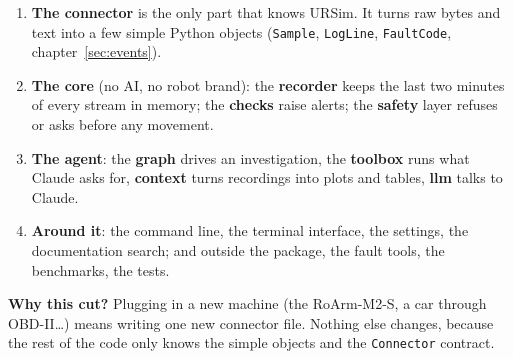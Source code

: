 \documentclass[10pt]{article}
\newcommand{\brkus}{\textunderscore\allowbreak}
\newcommand{\f}[1]{\texttt{\let\_\brkus #1}}
\begin{document}
\begin{enumerate}
\item \textbf{The connector} is the only part that knows URSim. It turns raw bytes and text into
a few simple Python objects (\f{Sample}, \f{LogLine}, \f{FaultCode}, chapter~\ref{sec:events}).
\item \textbf{The core} (no AI, no robot brand): the \textbf{recorder} keeps the last two minutes of
every stream in memory; the \textbf{checks} raise alerts; the \textbf{safety} layer refuses or
asks before any movement.
\item \textbf{The agent}: the \textbf{graph} drives an investigation, the \textbf{toolbox} runs
what Claude asks for, \textbf{context} turns recordings into plots and tables, \textbf{llm}
talks to Claude.
\item \textbf{Around it}: the command line, the terminal interface, the settings, the
documentation search; and outside the package, the fault tools, the benchmarks, the tests.
\end{enumerate}

\begin{why}
\textbf{Why this cut?} Plugging in a new machine (the RoArm-M2-S, a car through OBD-II\ldots)
means writing one new connector file. Nothing else changes, because the rest of the code only
knows the simple objects and the \f{Connector} contract.
\end{why}
\end{document}
